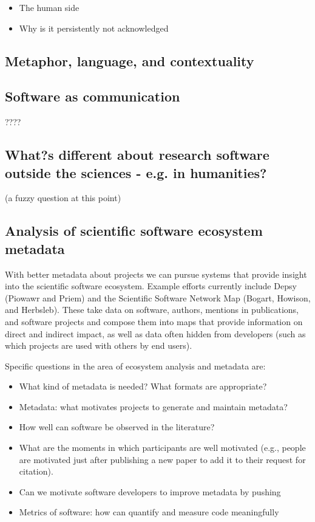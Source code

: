 \documentclass[a4paper,UKenglish]{dagman}
\begin{document}
\begin{itemize}
\item The human side
\item Why is it persistently not acknowledged
\end{itemize}

\subsection{Metaphor, language, and contextuality}

\subsection{Software as communication}

 ????


\subsection{What?s different about research software outside the sciences - e.g. in humanities?}

(a fuzzy question at this point)

\subsection{Analysis of scientific software ecosystem metadata}

With better metadata about projects we can pursue systems that provide insight into the scientific software ecosystem. Example efforts currently include Depsy (Piowawr and Priem) and the Scientific Software Network Map (Bogart, Howison, and Herbsleb). These take data on software, authors, mentions in publications, and software projects and compose them into maps that provide information on direct and indirect impact, as well as data often hidden from developers (such as which projects are used with others by end users).

Specific questions in the area of ecosystem analysis and metadata are:

\begin{itemize}
\item What kind of metadata is needed? What formats are appropriate?
\item Metadata: what motivates projects to generate and maintain metadata?
\item How well can software be observed in the literature?
\item What are the moments in which participants are well motivated (e.g., people are motivated just after publishing a new paper to add it to their request for citation).
\item Can we motivate software developers to improve metadata by pushing 
\item Metrics of software: how can quantify and measure code meaningfully
\end{itemize}
\end{document}
